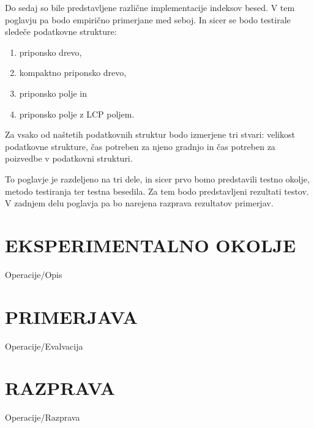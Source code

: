 Do sedaj so bile predstavljene različne implementacije indeksov besed. V tem poglavju pa bodo  empirično primerjane med seboj. In sicer se bodo testirale sledeče podatkovne strukture:
\begin{enumerate}
        \item priponsko drevo, %
        \item kompaktno priponsko drevo, 
        \item priponsko polje in 
        \item priponsko polje z LCP poljem.
\end{enumerate}
Za vsako od naštetih podatkovnih struktur bodo izmerjene tri stvari: velikost podatkovne strukture, čas potreben za njeno gradnjo in čas potreben za poizvedbe v podatkovni strukturi.

To poglavje je razdeljeno na tri dele, in sicer prvo bomo predstavili testno okolje, metodo testiranja ter testna besedila. Za tem bodo predstavljeni rezultati testov. V zadnjem delu poglavja pa bo narejena razprava rezultatov primerjav.

\section{EKSPERIMENTALNO OKOLJE}\label{sec:opis}
{Operacije/Opis}


\section{PRIMERJAVA}\label{sec:primerjava}
{Operacije/Evalvacija}

\section{RAZPRAVA}\label{sec:razprava}
{Operacije/Razprava}